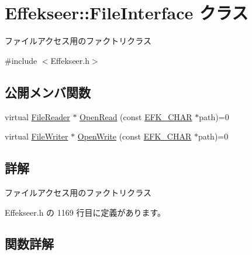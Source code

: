 \hypertarget{class_effekseer_1_1_file_interface}{}\section{Effekseer\+:\+:File\+Interface クラス}
\label{class_effekseer_1_1_file_interface}


ファイルアクセス用のファクトリクラス  




{\ttfamily \#include $<$Effekseer.\+h$>$}

\subsection*{公開メンバ関数}
\begin{DoxyCompactItemize}
\item 
virtual \mbox{\hyperlink{class_effekseer_1_1_file_reader}{File\+Reader}} $\ast$ \mbox{\hyperlink{class_effekseer_1_1_file_interface_ad8744ad57226d9a2ce74f6ef6e2f9a41}{Open\+Read}} (const \mbox{\hyperlink{_effekseer_8h_a50b026abea014b47854bcd835b3b6233}{E\+F\+K\+\_\+\+C\+H\+AR}} $\ast$path)=0
\item 
virtual \mbox{\hyperlink{class_effekseer_1_1_file_writer}{File\+Writer}} $\ast$ \mbox{\hyperlink{class_effekseer_1_1_file_interface_a1e60cb81a5cae39b37e44570ef693d91}{Open\+Write}} (const \mbox{\hyperlink{_effekseer_8h_a50b026abea014b47854bcd835b3b6233}{E\+F\+K\+\_\+\+C\+H\+AR}} $\ast$path)=0
\end{DoxyCompactItemize}


\subsection{詳解}
ファイルアクセス用のファクトリクラス 

 Effekseer.\+h の 1169 行目に定義があります。



\subsection{関数詳解}
\mbox{\label{class_effekseer_1_1_file_interface_ad8744ad57226d9a2ce74f6ef6e2f9a41}} 
